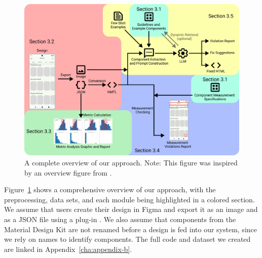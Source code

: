 \documentclass[11pt,titlepage,oneside,openany]{book}
\begin{document}
\begin{figure}[H]
	\centering
	\includegraphics[width=\textwidth]{figures/overview.pdf}
	\caption{A complete overview of our approach. Note: This figure was inspired by an overview figure from \cite{lu_ai_2024}.}
	\label{fig:overview}
\end{figure}

Figure~\ref{fig:overview} shows a comprehensive overview of our approach, with the preprocessing, data sets, and each module being highlighted in a colored section. We assume that users create their design in Figma and export it as an image and as a JSON file using a plug-in \cite{noauthor_json_nodate}. We also assume that components from the Material Design Kit are not renamed before a design is fed into our system, since we rely on names to identify components. The full code and dataset we created are linked in Appendix~\ref{cha:appendix-b}.
\end{document}
